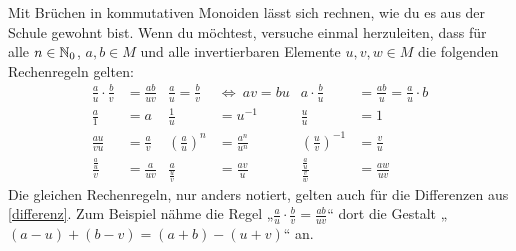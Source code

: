 \begin{bem}
    Mit Brüchen in kommutativen Monoiden lässt sich rechnen, wie du es aus der Schule gewohnt bist. Wenn du möchtest, versuche einmal herzuleiten, dass für alle $n\in \mathbb N_0$, $a,b\in M$ und alle invertierbaren Elemente $u,v,w\in M$ die folgenden Rechenregeln gelten:
    \begingroup
    \allowdisplaybreaks
    \begin{align*}
    \frac{a}{u}\cdot \frac{b}{v} & = \frac{ab}{uv} & \frac{a}{u}=\frac{b}{v}\ & \Leftrightarrow\ av=bu & a\cdot \frac{b}{u} & = \frac{ab}{u} = \frac{a}{u}\cdot b \\[0.5em]
    \frac{a}{1} & = a & \frac{1}{u} & = u^{-1} & \frac{u}{u} & = 1 \\[0.5em]
    \frac{au}{vu} & = \frac{a}{v} & \left(\frac{a}{u}\right)^n & = \frac{a^n}{u^n} & \left(\frac{u}{v}\right)^{-1} & = \frac{v}{u} \\[0.5em]
    \frac{\frac{a}{u}}{v} & = \frac{a}{uv} & \frac{a}{\frac{u}{v}} & = \frac{av}{u} & \frac{\frac{a}{u}}{\frac{v}{w}} & = \frac{aw}{uv}
    \end{align*}
    \endgroup
    Die gleichen Rechenregeln, nur anders notiert, gelten auch für die Differenzen aus \cref{differenz}. Zum Beispiel nähme die Regel „$\frac{a}{u}\cdot \frac{b}{v}=\frac{ab}{uv}$“ dort die Gestalt „$(a-u)+(b-v) = (a+b)-(u+v)$“ an.
\end{bem}


